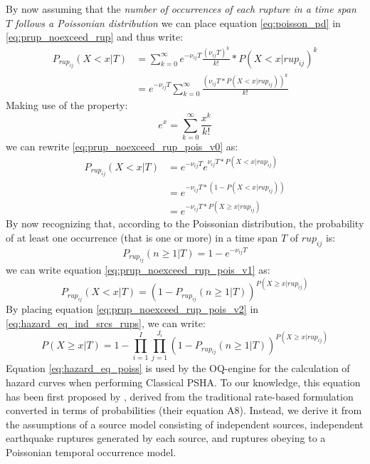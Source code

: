 By now assuming that the \textit{number of occurrences of each rupture in a time span $T$ follows a Poissonian distribution}
we can place equation \ref{eq:poisson_pd} in \ref{eq:prup_noexceed_rup} and thus write:
\begin{align}
\label{eq:prup_noexceed_rup_pois_v0}
P_{rup_{ij}}(X < x | T) & = \sum_{k=0}^{\infty} e^{-\nu_{ij} T} \frac{(\nu_{ij} T) ^ {k}}{k!} * P(X < x | rup_{ij}) ^ {k} \nonumber \\
				 & =  e^{-\nu_{ij} T} \sum_{k=0}^{\infty} \frac{(\nu_{ij} T * P(X < x | rup_{ij})) ^ {k}}{k!}
\end{align}
Making use of the property:
\begin{equation}
e^{x} = \sum_{k=0} ^ {\infty} \frac{x^{k}}{k!}
\end{equation}
we can rewrite \ref{eq:prup_noexceed_rup_pois_v0} as:
\begin{align}
\label{eq:prup_noexceed_rup_pois_v1}
P_{rup_{ij}}(X < x | T) & = e^{-\nu_{ij} T} e ^ {\nu_{ij} T * P(X < x | rup_{ij})} \nonumber \\
				 & = e^{-\nu_{ij} T * (1 - P(X < x | rup_{ij}))} \nonumber \\
				 & = e^{-\nu_{ij} T * P(X \ge x | rup_{ij})}
\end{align}
By now recognizing that, according to the Poissonian distribution, the probability of at least one occurrence
(that is one or more) in a time span $T$ of $rup_{ij}$ is:
\begin{equation}
P_{rup_{ij}}(n \ge 1 | T) = 1 -  e^{-\nu_{ij} T}
\end{equation}
we can write equation \ref{eq:prup_noexceed_rup_pois_v1} as:
\begin{equation}
\label{eq:prup_noexceed_rup_pois_v2}
P_{rup_{ij}}(X < x | T) = (1 - P_{rup_{ij}}(n \ge 1 | T))^{P(X \ge x | rup_{ij})}
\end{equation}
By placing equation \ref{eq:prup_noexceed_rup_pois_v2} in \ref{eq:hazard_eq_ind_srcs_rups}, we can
write:
\begin{equation}
\label{eq:hazard_eq_poiss}
P(X \ge x | T) =  1 - \prod_{i=1}^{I} \prod_{j=1}^{J_{i}} (1 - P_{rup_{ij}}(n \ge 1 | T))^{P(X \ge x | rup_{ij})}
\end{equation}
Equation \ref{eq:hazard_eq_poiss} is used by the OQ-engine for the calculation of hazard curves when performing
Classical PSHA. To our knowledge, this equation has been first proposed by \citet{field2003},
derived from the traditional rate-based formulation converted in terms of probabilities (their equation A8).
Instead, we derive it from the assumptions of a source model consisting of independent sources, independent
earthquake ruptures generated by each source, and ruptures obeying to a Poissonian temporal occurrence model.

